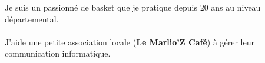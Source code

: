 \documentclass[10pt,A4]{article}
\begin{document}
\begin{minipage}{0.59\textwidth}
{		%

		\parbox[b][3cm][c]{7cm}{
			\textcolor{textcol}{Je suis un passionné de basket que je pratique depuis 20 ans au niveau départemental.}
			\\
			\\
			\textcolor{textcol}{J'aide une petite association locale (\textbf{Le Marlio'Z Café}}) à gérer leur communication informatique.
			\\
			\\
			\\
			\\
			\\
			\\
			\\
			
		}

		
	}
\end{minipage}
\begin{minipage}{0.05\textwidth}
	\begin{center}
	\end{center}
\end{minipage}
\end{document}
